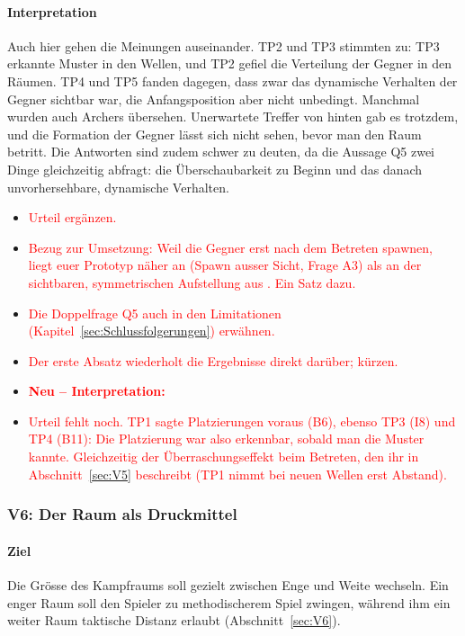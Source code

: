 \documentclass[../Main.tex]{subfiles}
\begin{document}
\paragraph{Interpretation}
Auch hier gehen die Meinungen auseinander. TP2 und TP3 stimmten zu: TP3 erkannte Muster in den Wellen, und TP2 gefiel die Verteilung der Gegner in den Räumen. TP4 und TP5 fanden dagegen, dass zwar das dynamische Verhalten der Gegner sichtbar war, die Anfangsposition aber nicht unbedingt. Manchmal wurden auch Archers übersehen. Unerwartete Treffer von hinten gab es trotzdem, und die Formation der Gegner lässt sich nicht sehen, bevor man den Raum betritt. Die Antworten sind zudem schwer zu deuten, da die Aussage Q5 zwei Dinge gleichzeitig abfragt: die Überschaubarkeit zu Beginn und das danach unvorhersehbare, dynamische Verhalten.

\begin{itemize}[leftmargin=1.5cm]
    \item \textcolor{red}{Urteil ergänzen.}
    \item \textcolor{red}{Bezug zur Umsetzung: Weil die Gegner erst nach dem Betreten spawnen, liegt euer Prototyp näher an  (Spawn ausser Sicht, Frage A3) als an der sichtbaren, symmetrischen Aufstellung aus . Ein Satz dazu.}
    \item \textcolor{red}{Die Doppelfrage Q5 auch in den Limitationen (Kapitel~\ref{sec:Schlussfolgerungen}) erwähnen.}
    \item \textcolor{red}{Der erste Absatz wiederholt die Ergebnisse direkt darüber; kürzen.}
\end{itemize}

\begin{itemize}[leftmargin=1.5cm]
    \item \textcolor{red}{\textbf{Neu -- Interpretation:}}
    \item \textcolor{red}{Urteil fehlt noch. TP1 sagte Platzierungen voraus (B6), ebenso TP3 (I8) und TP4 (B11): Die Platzierung war also erkennbar, sobald man die Muster kannte. Gleichzeitig der Überraschungseffekt beim Betreten, den ihr in Abschnitt~\ref{sec:V5} beschreibt (TP1 nimmt bei neuen Wellen erst Abstand).}
\end{itemize}

\subsubsection{V6: Der Raum als Druckmittel}

\paragraph{Ziel}
Die Grösse des Kampfraums soll gezielt zwischen Enge und Weite wechseln. Ein enger Raum soll den Spieler zu methodischerem Spiel zwingen, während ihm ein weiter Raum taktische Distanz erlaubt (Abschnitt~\ref{sec:V6}).
\end{document}
